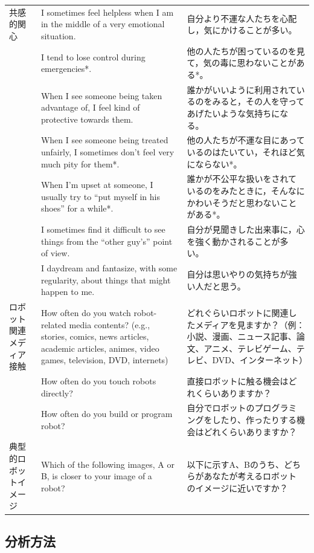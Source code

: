 \documentclass[a4j,12pt]{jreport}
\begin{document}
\begin{center}
{\begin{longtable}{lp{5cm}p{5cm}}
共感的関心&I sometimes feel helpless when I am in the middle of a very emotional situation.&自分より不運な人たちを心配し，気にかけることが多い。\\
&I tend to lose control during emergencies*.&他の人たちが困っているのを見て，気の毒に思わないことがある*。\\
&When I see someone being taken advantage of, I feel kind of protective towards them.&誰かがいいように利用されているのをみると，その人を守ってあげたいような気持ちになる。\\
&When I see someone being treated unfairly, I sometimes don't feel very much pity for them*.&他の人たちが不運な目にあっているのはたいてい，それほど気にならない*。\\
&When I'm upset at someone, I usually try to ``put myself in his shoes'' for a while*.&誰かが不公平な扱いをされているのをみたときに，そんなにかわいそうだと思わないことがある*。\\
&I sometimes find it difficult to see things from the ``other guy's'' point of view.&自分が見聞きした出来事に，心を強く動かされることが多い。\\
&I daydream and fantasize, with some regularity, about things that might happen to me.&自分は思いやりの気持ちが強い人だと思う。\\
ロボット関連メディア接触&How often do you watch robot-related media contents? (e.g., stories, comics, news articles, academic articles, animes, video games, television, DVD, internets)&どれぐらいロボットに関連したメディアを見ますか？（例：小説、漫画、ニュース記事、論文、アニメ、テレビゲーム、テレビ、DVD、インターネット）\\
&How often do you touch robots directly?&直接ロボットに触る機会はどれくらいありますか？\\
&How often do you build or program robot?&自分でロボットのプログラミングをしたり、作ったりする機会はどれくらいありますか？\\
典型的ロボットイメージ&Which of the following images, A or B, is closer to your image of a robot?&以下に示すA、Bのうち、どちらがあなたが考えるロボットのイメージに近いですか？



\end{longtable}
}

\end{center}






\subsection{分析方法}
\end{document}

